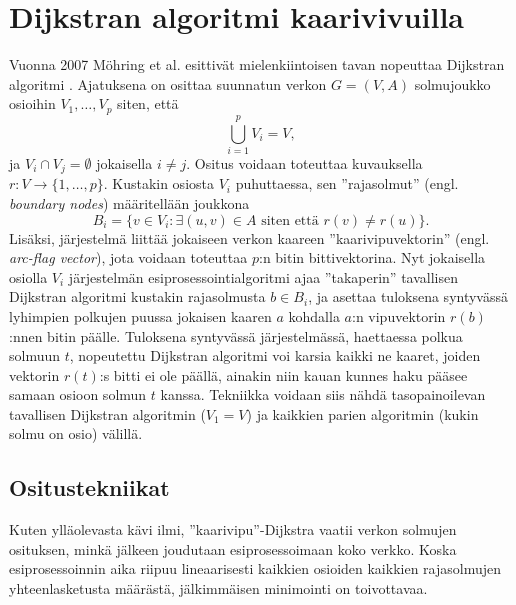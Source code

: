 \documentclass[finnish]{tktltiki2}
\theoremstyle{definition}
\theoremstyle{remark}
\begin{document}
\section{Dijkstran algoritmi kaarivivuilla}
Vuonna 2007 Möhring et al. esittivät mielenkiintoisen tavan nopeuttaa Dijkstran algoritmi \cite{Mohring07}. Ajatuksena on osittaa suunnatun verkon $G=(V, A)$ solmujoukko osioihin $V_1, \dots, V_p$ siten, että
\[
\bigcup_{i = 1}^p V_i = V,
\]
ja $V_i \cap V_j = \emptyset$ jokaisella $i \neq j$. Ositus voidaan toteuttaa kuvauksella $r \colon V \to \{1, \dots, p\}$. Kustakin osiosta $V_i$ puhuttaessa, sen ''rajasolmut'' (engl. \textit{boundary nodes}) määritellään joukkona
\[
B_i = \{ v \in V_i \colon \exists(u, v) \in A \text{ siten että } r(v) \neq r(u) \}.
\]
Lisäksi, järjestelmä liittää jokaiseen verkon kaareen ''kaarivipuvektorin'' (engl. \textit{arc-flag vector}), jota voidaan toteuttaa $p$:n bitin bittivektorina. Nyt jokaisella osiolla $V_i$ järjestelmän esiprosessointialgoritmi ajaa ''takaperin'' tavallisen Dijkstran algoritmi kustakin rajasolmusta $b \in B_i$, ja asettaa tuloksena syntyvässä lyhimpien polkujen puussa jokaisen kaaren $a$ kohdalla $a$:n vipuvektorin $r(b)$:nnen bitin päälle. Tuloksena syntyvässä järjestelmässä, haettaessa polkua solmuun $t$, nopeutettu Dijkstran algoritmi voi karsia kaikki ne kaaret, joiden vektorin $r(t)$:s bitti ei ole päällä, ainakin niin kauan kunnes haku pääsee samaan osioon solmun $t$ kanssa. Tekniikka voidaan siis nähdä tasopainoilevan tavallisen Dijkstran algoritmin ($V_1 = V$) ja kaikkien parien algoritmin (kukin solmu on osio) välillä.

\subsection{Ositustekniikat}
 Kuten ylläolevasta kävi ilmi, ''kaarivipu''-Dijkstra vaatii verkon solmujen osituksen, minkä jälkeen joudutaan esiprosessoimaan koko verkko. Koska esiprosessoinnin aika riipuu lineaarisesti kaikkien osioiden kaikkien rajasolmujen yhteenlasketusta määrästä, jälkimmäisen minimointi on toivottavaa. 
 
\end{document}
